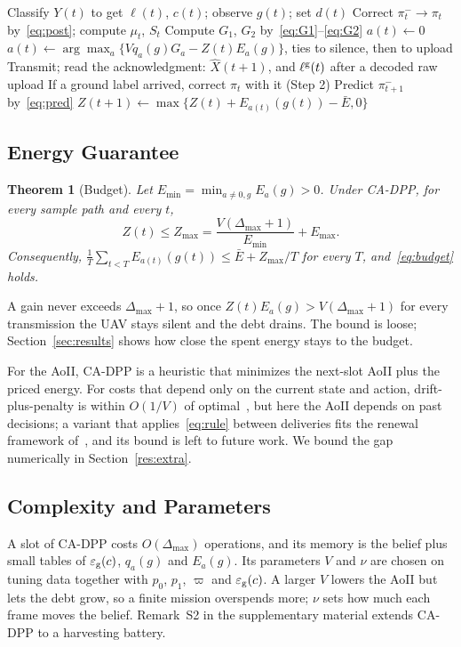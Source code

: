 \documentclass[10pt,journal,compsoc]{IEEEtran}
\newtheorem{theorem}{Theorem}
\theoremstyle{remark}
\newcommand{\lab}{\ell}
\newcommand{\ee}{\varepsilon}
\begin{document}
\begin{algorithm}[t]
\caption{CA-DPP, executed by the UAV in slot $t$}\label{alg:dpp}
\begin{algorithmic}[1]
\State Classify $Y(t)$ to get $\lab(t)$, $c(t)$; observe $g(t)$; set $d(t)$
\State Correct $\pi^-_t\to\pi_t$ by~\eqref{eq:post}; compute $\mu_t$, $S_t$
\State Compute $G_1$, $G_2$ by~\eqref{eq:G1}--\eqref{eq:G2}
 $a(t)\gets0$
\Else\ $a(t)\gets\arg\max_a\{Vq_a(g)G_a-Z(t)E_a(g)\}$, ties to silence, then to upload
\EndIf
\State Transmit; read the acknowledgment: $\hat X(t+1)$, and $\lab^{\rm g}(t)$ after a decoded raw upload
\State If a ground label arrived, correct $\pi_t$ with it (Step 2)
\State Predict $\pi^-_{t+1}$ by~\eqref{eq:pred}
\State $Z(t+1)\gets\max\big\{Z(t)+E_{a(t)}(g(t))-\bar E,0\big\}$
\end{algorithmic}
\end{algorithm}


\subsection{Energy Guarantee}
\begin{theorem}[Budget]\label{thm:budget}
Let $E_{\min}=\min_{a\neq0,g}E_a(g)>0$. Under CA-DPP, for every sample path and every $t$,
\begin{equation}\label{eq:Zmax}
Z(t)\le Z_{\max}=\frac{V(\Delta_{\max}+1)}{E_{\min}}+E_{\max}.
\end{equation}
Consequently, $\frac1T\sum_{t<T}E_{a(t)}(g(t))\le\bar E+Z_{\max}/T$ for every $T$, and~\eqref{eq:budget} holds.
\end{theorem}

A gain never exceeds $\Delta_{\max}+1$, so once $Z(t)E_a(g)>V(\Delta_{\max}+1)$ for every transmission the UAV stays silent and the debt drains. The bound is loose; Section~\ref{sec:results} shows how close the spent energy stays to the budget.

For the AoII, CA-DPP is a heuristic that minimizes the next-slot AoII plus the priced energy. For costs that depend only on the current state and action, drift-plus-penalty is within $O(1/V)$ of optimal~\cite{neely2010book}, but here the AoII depends on past decisions; a variant that applies~\eqref{eq:rule} between deliveries fits the renewal framework of~\cite{neely2013renewal}, and its bound is left to future work. We bound the gap numerically in Section~\ref{res:extra}.

\subsection{Complexity and Parameters}
A slot of CA-DPP costs $O(\Delta_{\max})$ operations, and its memory is the belief plus small tables of $\ee_{\rm g}(c)$, $q_a(g)$ and $E_a(g)$. Its parameters $V$ and $\nu$ are chosen on tuning data together with $p_0$, $p_1$, $\varpi$ and $\ee_{\rm g}(c)$. A larger $V$ lowers the AoII but lets the debt grow, so a finite mission overspends more; $\nu$ sets how much each frame moves the belief. Remark~S2 in the supplementary material extends CA-DPP to a harvesting battery.
\end{document}
